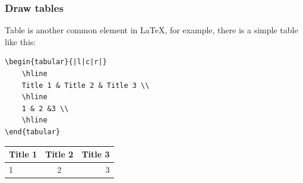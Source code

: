 \begin{frame}[fragile]
	\frametitle{Draw tables}
	Table is another common element in \LaTeX, for example, there is a simple table like this:
    \begin{example}
    	\begin{verbatim}
\begin{tabular}{|l|c|r|}
    \hline
    Title 1 & Title 2 & Title 3 \\
    \hline
    1 & 2 &3 \\
    \hline
\end{tabular}
    	\end{verbatim}
    \end{example}
    \begin{table}[htbp]
    \centering
    \begin{tabular}{|l|c|r|}
        \hline
        Title 1 & Title 2 & Title 3 \\
        \hline
        1 & 2 &3 \\
        \hline
    \end{tabular}
	\end{table}
\end{frame}

